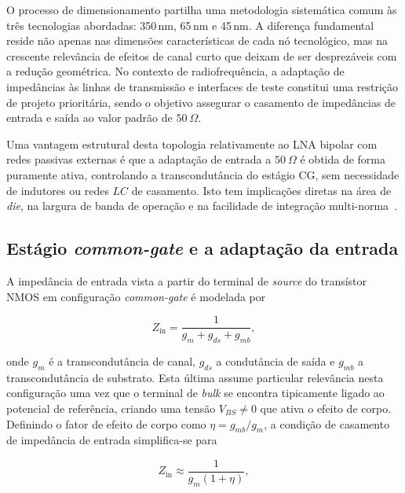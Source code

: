 O processo de dimensionamento partilha uma metodologia sistemática comum às três tecnologias
abordadas: 350\,nm, 65\,nm e 45\,nm. A diferença fundamental reside não apenas nas dimensões
características de cada nó tecnológico, mas na crescente relevância de efeitos de canal curto que
deixam de ser desprezáveis com a redução geométrica. No contexto de radiofrequência, a adaptação de
impedâncias às linhas de transmissão e interfaces de teste constitui uma restrição de projeto
prioritária, sendo o objetivo assegurar o casamento de impedâncias de entrada e saída ao valor padrão
de $50~\Omega$.

Uma vantagem estrutural desta topologia relativamente ao LNA bipolar com redes passivas externas é
que a adaptação de entrada a $50~\Omega$ é obtida de forma puramente ativa, controlando a
transcondutância do estágio CG, sem necessidade de indutores ou redes $LC$ de casamento. Isto tem
implicações diretas na área de \textit{die}, na largura de banda de operação e na facilidade de
integração multi-norma~\cite{bastos2014}.

\subsection*{Estágio \textit{common-gate} e a adaptação da entrada}

A impedância de entrada vista a partir do terminal de \textit{source} do transístor NMOS em
configuração \textit{common-gate} é modelada por

\begin{equation}
    Z_{\text{in}} = \frac{1}{g_m + g_{ds} + g_{mb}},
    \label{eq:zin}
\end{equation}

onde $g_m$ é a transcondutância de canal, $g_{ds}$ a condutância de saída e $g_{mb}$ a
transcondutância de substrato. Esta última assume particular relevância nesta configuração uma vez que
o terminal de \textit{bulk} se encontra tipicamente ligado ao potencial de referência, criando uma
tensão $V_{BS} \neq 0$ que ativa o efeito de corpo. Definindo o fator de efeito de corpo como
$\eta = g_{mb}/g_m$, a condição de casamento de impedância de entrada simplifica-se para

\begin{equation}
    Z_{\text{in}} \approx \frac{1}{g_m(1 + \eta)},
    \label{eq:zin_eta}
\end{equation}


